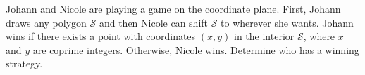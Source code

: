 Johann and Nicole are playing a game on the coordinate plane.
First, Johann draws any polygon $\mathcal{S}$ and then Nicole can shift $\mathcal{S}$ to wherever she wants.
Johann wins if there exists a point with coordinates $(x,y)$ in the interior $\mathcal{S}$,
where $x$ and $y$ are coprime integers.
Otherwise, Nicole wins.
Determine who has a winning strategy.
